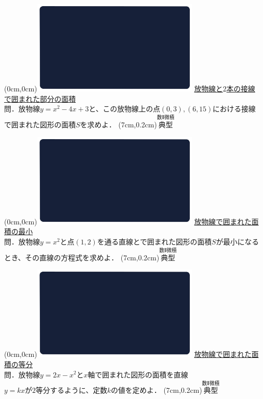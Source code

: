 \documentclass[10pt,
fleqn,
dvipdfmx,
uplatex
]{jsarticle}
\begin{document}
\bf\boldmath

\at(0cm,0cm){\includegraphics[width=8cm,bb=0 0 1920 1080]{./media_local/smart_background/数II微積.jpeg}}
{\color{orange}\normalsize\underline{放物線と$2$本の接線で囲まれた部分の面積}}\vspace{0.3zw}\\
\Large
 問．放物線$y=x^2-4x+3$と、この放物線上の点$\left(0,3\right),\left(6,{15}\right)$における接線で囲まれた図形の面積$S$を求めよ．
\at(7cm,0.2cm){\small\color{bradorange}$\overset{\text{数Ⅱ微積}}{\text{典型}}$}

\newpage



\at(0cm,0cm){\includegraphics[width=8cm,bb=0 0 1920 1080]{./media_local/smart_background/数II微積.jpeg}}
{\color{orange}\Large\underline{放物線で囲まれた面積の最小}}\vspace{0.3zw}\\
\Large
 問．放物線$y=x^2$と点$\left(1,2\right)$を通る直線とで囲まれた図形の面積$S$が最小になるとき、その直線の方程式を求めよ．
\at(7cm,0.2cm){\small\color{bradorange}$\overset{\text{数Ⅱ微積}}{\text{典型}}$}

\newpage



\at(0cm,0cm){\includegraphics[width=8cm,bb=0 0 1920 1080]{./media_local/smart_background/数II微積.jpeg}}
{\color{orange}\Large\underline{放物線で囲まれた面積の等分}}\vspace{0.3zw}\\
\Large 
 問．放物線$y=2x-x^2$と$x$軸で囲まれた図形の面積を直線\\$y=kx$が$2$等分するように、定数$k$の値を定めよ．
\at(7cm,0.2cm){\small\color{bradorange}$\overset{\text{数Ⅱ微積}}{\text{典型}}$}
\end{document}

